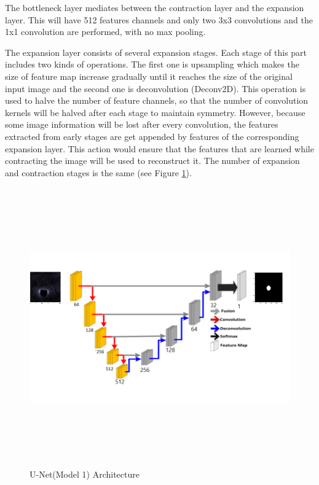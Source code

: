 \documentclass[runningheads,a4paper,11pt]{report}
\begin{document}
The bottleneck layer mediates between the contraction layer and the expansion layer. This will have 512 features channels and only two 3x3 convolutions and the 1x1 convolution are performed, with no max pooling. 

The expansion layer consists of several expansion stages. Each stage of this part includes two kinds of operations. The first one is upsampling which makes the size of feature map increase gradually until it reaches the size of the original input image and the second one is deconvolution (Deconv2D). This operation is used to halve the number of feature channels, so that the number of convolution kernels will be halved after each stage to maintain symmetry. However, because some image information will be lost after every convolution, the features extracted from early stages are get appended by features of the corresponding expansion layer. This action would ensure that the features that are learned while contracting the image will be used to reconstruct it. The number of expansion and contraction stages is the same (see Figure \ref{unet_architecture1}). \par 

\begin{figure}[!h]
	\centerline{\includegraphics[width=20cm, height=12cm]{images/Unet_model1.png}}  
	\caption{U-Net(Model 1) Architecture}
	\label{unet_architecture1}
\end{figure}
\end{document}

